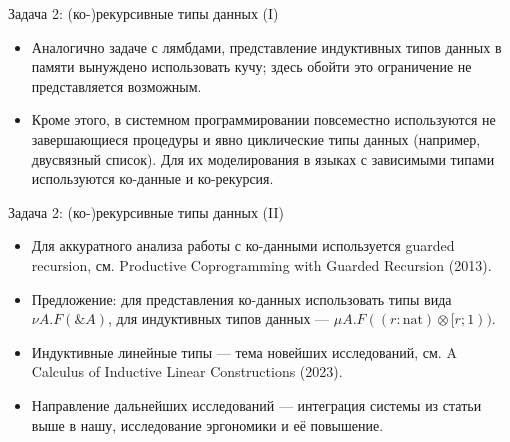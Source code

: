 \documentclass{beamer}
\begin{document}
\begin{frame}{Задача 2: (ко-)рекурсивные типы данных (I)}
  \begin{itemize}
    \item Аналогично задаче с лямбдами, представление индуктивных типов
      данных в памяти вынуждено использовать кучу; здесь обойти это ограничение
      не представляется возможным.
    \item Кроме этого, в системном программировании повсеместно используются не
      завершающиеся процедуры и явно циклические типы данных (например,
      двусвязный список). Для их моделирования в языках с зависимыми типами
      используются ко-данные и ко-рекурсия.
  \end{itemize}
\end{frame}

\begin{frame}{Задача 2: (ко-)рекурсивные типы данных (II)}
  \begin{itemize}
    \item Для аккуратного анализа работы с ко-данными используется guarded
      recursion, см. Productive Coprogramming with Guarded Recursion (2013).
    \item Предложение: для представления ко-данных использовать типы вида
      $\nu A. F(\& A)$, для индуктивных типов данных ---
      $\mu A. F((r : \mathrm{nat}) \otimes [r; 1))$.
    \item Индуктивные линейные типы --- тема новейших исследований, см.
      A Calculus of Inductive Linear Constructions (2023).
    \item Направление дальнейших исследований --- интеграция системы из статьи
      выше в нашу, исследование эргономики и её повышение.
  \end{itemize}
\end{frame}
\end{document}
